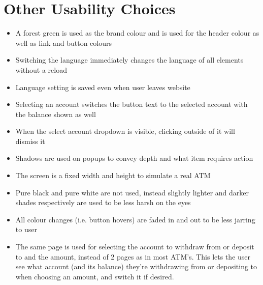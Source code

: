 \documentclass[10pt]{article}
\begin{document}
\section*{Other Usability Choices}
\begin{itemize}
\item A forest green is used as the brand colour and is used for the header colour as well as link and button colours
\item Switching the language immediately changes the language of all elements without a reload
\item Language setting is saved even when user leaves website
\item Selecting an account switches the button text to the selected account with the balance shown as well
\item When the select account dropdown is visible, clicking outside of it will dismiss it
\item Shadows are used on popups to convey depth and what item requires action
\item The screen is a fixed width and height to simulate a real ATM
\item Pure black and pure white are not used, instead slightly lighter and darker shades respectively are used to be less harsh on the eyes
\item All colour changes (i.e. button hovers) are faded in and out to be less jarring to user
\item The same page is used for selecting the account to withdraw from or deposit to and the amount, instead of 2 pages as in most ATM's. This lets the user see what account (and its balance) they're withdrawing from or depositing to when choosing an amount, and switch it if desired.
\end{itemize}
\end{document}
